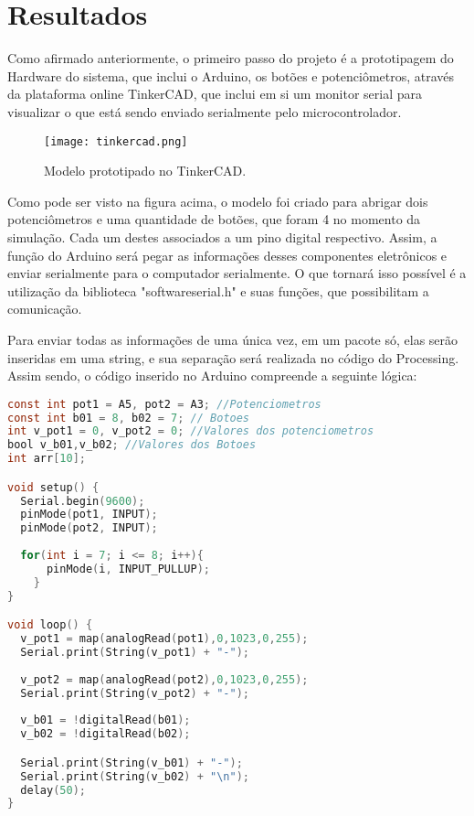 \section{Resultados}

	Como afirmado anteriormente, o primeiro passo do projeto é a prototipagem do Hardware do sistema, que inclui o Arduino, os botões e potenciômetros, através da plataforma online TinkerCAD, que inclui em si um monitor serial para visualizar o que está sendo enviado serialmente pelo microcontrolador.

\begin{figure}[htbp]
     \centerline{
        \texttt{[image: tinkercad.png]}
        }
     \caption{Modelo prototipado no TinkerCAD.}
     \label{fig}
    \end{figure}

	Como pode ser visto na figura acima, o modelo foi criado para abrigar dois potenciômetros e uma quantidade de botões, que foram 4 no momento da simulação. Cada um destes associados a um pino digital respectivo. Assim, a função do Arduino será pegar as informações desses componentes eletrônicos e enviar serialmente para o computador serialmente. O que tornará isso possível é a utilização da biblioteca "softwareserial.h" e suas funções, que possibilitam a comunicação.
	
	Para enviar todas as informações de uma única vez, em um pacote só, elas serão inseridas em uma string, e sua separação será realizada no código do Processing. Assim sendo, o código inserido no Arduino compreende a seguinte lógica:

\begin{lstlisting}[language=C]
const int pot1 = A5, pot2 = A3; //Potenciometros
const int b01 = 8, b02 = 7; // Botoes
int v_pot1 = 0, v_pot2 = 0; //Valores dos potenciometros
bool v_b01,v_b02; //Valores dos Botoes
int arr[10];

void setup() {
  Serial.begin(9600);
  pinMode(pot1, INPUT);
  pinMode(pot2, INPUT);
  
  for(int i = 7; i <= 8; i++){
      pinMode(i, INPUT_PULLUP);
    }
}

void loop() {
  v_pot1 = map(analogRead(pot1),0,1023,0,255);
  Serial.print(String(v_pot1) + "-");
  
  v_pot2 = map(analogRead(pot2),0,1023,0,255);
  Serial.print(String(v_pot2) + "-");
  
  v_b01 = !digitalRead(b01);
  v_b02 = !digitalRead(b02);

  Serial.print(String(v_b01) + "-");
  Serial.print(String(v_b02) + "\n");
  delay(50);
}
\end{lstlisting}







